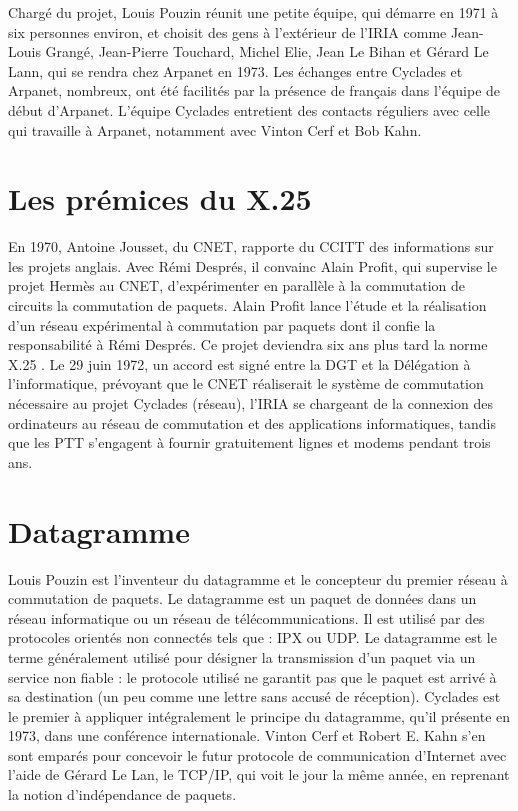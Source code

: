 \documentclass[12pt]{report}
\begin{document}
Chargé du projet, Louis Pouzin réunit une petite équipe, qui démarre en 1971 à six personnes environ, et choisit des gens à l’extérieur de l’IRIA comme Jean-Louis Grangé, Jean-Pierre Touchard, Michel Elie, Jean Le Bihan et Gérard Le Lann, qui se rendra chez Arpanet en 1973. Les échanges entre Cyclades et Arpanet, nombreux, ont été facilités par la présence de français dans l'équipe de début d'Arpanet. L'équipe Cyclades entretient des contacts réguliers avec celle qui travaille à Arpanet, notamment avec Vinton Cerf et Bob Kahn.

\section{Les prémices du X.25}

En 1970, Antoine Jousset, du \gls{CNET}, rapporte du \gls{CCITT} des informations sur les projets anglais. Avec Rémi Després, il convainc Alain Profit, qui supervise le projet Hermès au CNET, d’expérimenter en parallèle à la commutation de circuits la commutation de paquets. Alain Profit lance l'étude et la réalisation d'un réseau expérimental à commutation par paquets dont il confie la responsabilité à Rémi Després. Ce projet deviendra six ans plus tard la norme X.25 \cite{wikicnet}. Le 29 juin 1972, un accord est signé entre la DGT et la Délégation à l’informatique, prévoyant que le CNET réaliserait le système de commutation nécessaire au projet Cyclades (réseau), l’IRIA se chargeant de la connexion des ordinateurs au réseau de commutation et des applications informatiques, tandis que les \gls{PTT} s’engagent à fournir gratuitement lignes et modems pendant trois ans.

\section{Datagramme}

Louis Pouzin est l'inventeur du datagramme et le concepteur du premier réseau à commutation de paquets.
Le datagramme est un paquet de données dans un réseau informatique ou un réseau de télécommunications. Il est utilisé par des protocoles orientés \og non connectés \fg tels que : IPX ou UDP. Le datagramme est le terme généralement utilisé pour désigner la transmission d'un paquet via un service non \og fiable \fg : le protocole utilisé ne garantit pas que le paquet est arrivé à sa destination (un peu comme une lettre sans accusé de réception). Cyclades est le premier à appliquer intégralement le principe du datagramme, qu'il présente en 1973, dans une conférence internationale. Vinton Cerf et Robert E. Kahn s'en sont emparés pour concevoir le futur protocole de communication d'Internet avec l'aide de Gérard Le Lan, le TCP/IP, qui voit le jour la même année, en reprenant la notion d'indépendance de paquets\cite{wikidtg}.
\end{document}

